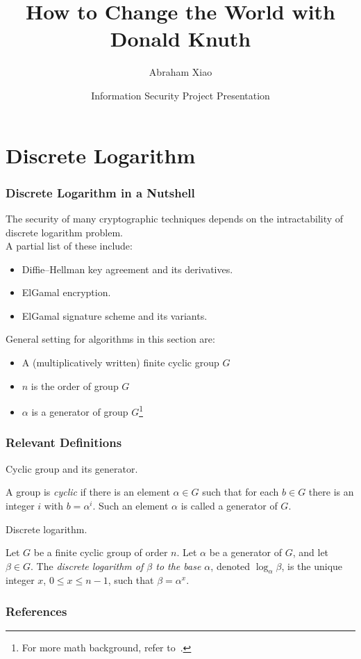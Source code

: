 \documentclass[hyperref=true]{beamer}
\begin{document}
\title[Change the World]{How to Change the World with Donald Knuth}
\author{Abraham Xiao}
\date[CIS612 Presentation]{Information Security Project Presentation}



\begin{frame}
  \titlepage{}
\end{frame}

\begin{frame}
  \tableofcontents{}
\end{frame}

\section{Discrete Logarithm}




\begin{frame}
  \frametitle{Discrete Logarithm in a Nutshell}
The security of many cryptographic techniques depends on the
intractability of discrete logarithm problem.\\[4pt]A partial list of these
include:
\begin{itemize}
\item Diffie–Hellman key agreement and its derivatives.
\item ElGamal encryption.
\item ElGamal signature scheme and its variants.
\end{itemize}
General setting for algorithms in this section are:
\begin{itemize}
\item A (multiplicatively written) finite cyclic group $G$
\item $n$ is the order of group $G$
\item $\alpha$ is a generator of group $G$\footnote{For more math
    background, refer to~\cite{Rosen:2012}.}
\end{itemize}
\end{frame}

\begin{frame}
  \frametitle{Relevant Definitions}
Cyclic group and its generator.
  \begin{definition}
    A group is \emph{cyclic} if there is an element $\alpha\in G$ such
    that for each $b\in G$ there is an integer $i$ with
    $b=\alpha^{i}$. Such an element $\alpha$ is called a generator of $G$.
  \end{definition}
Discrete logarithm.
  \begin{definition}
    Let $G$ be a finite cyclic group of order $n$. Let $\alpha$ be a
    generator of $G$, and let $\beta\in G$. The \emph{discrete
      logarithm of $\beta$ to the base $\alpha$}, denoted
    $\log_{\alpha}\beta$, is the unique integer $x$, $0\leq x\leq
    n-1$, such that $\beta=\alpha^{x}$\cite{Menezes:1996:HAC:548089}.
  \end{definition}
\end{frame}






\begin{frame}[allowframebreaks]
  \frametitle{References}



\end{frame}
\end{document}
